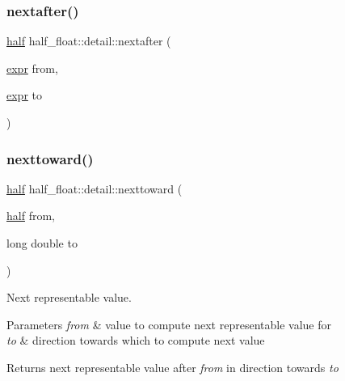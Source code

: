 \mbox{\label{namespacehalf__float_1_1detail_abcc7d0402bd1f7a94709bc16012baff2}} 
\subsubsection{\texorpdfstring{nextafter()}{nextafter()}\hspace{0.1cm}{\footnotesize\ttfamily [4/4]}}
{\footnotesize\ttfamily \hyperlink{classhalf__float_1_1half}{half} half\+\_\+float\+::detail\+::nextafter (\begin{DoxyParamCaption}\item[{\hyperlink{structhalf__float_1_1detail_1_1expr}{expr}}]{from,  }\item[{\hyperlink{structhalf__float_1_1detail_1_1expr}{expr}}]{to }\end{DoxyParamCaption})\hspace{0.3cm}{\ttfamily [inline]}}

\mbox{\label{namespacehalf__float_1_1detail_aef57aa188ad54b4740b8c3aed38c3c36}} 
\subsubsection{\texorpdfstring{nexttoward()}{nexttoward()}\hspace{0.1cm}{\footnotesize\ttfamily [1/2]}}
{\footnotesize\ttfamily \hyperlink{classhalf__float_1_1half}{half} half\+\_\+float\+::detail\+::nexttoward (\begin{DoxyParamCaption}\item[{\hyperlink{classhalf__float_1_1half}{half}}]{from,  }\item[{long double}]{to }\end{DoxyParamCaption})\hspace{0.3cm}{\ttfamily [inline]}}

Next representable value. 
\begin{DoxyParams}{Parameters}
{\em from} & value to compute next representable value for \\
\hline
{\em to} & direction towards which to compute next value \\
\hline
\end{DoxyParams}
\begin{DoxyReturn}{Returns}
next representable value after {\itshape from} in direction towards {\itshape to} 
\end{DoxyReturn}
\mbox{\label{namespacehalf__float_1_1detail_ae9f3e0b8320a8104eecd193179ee58d5}} 
